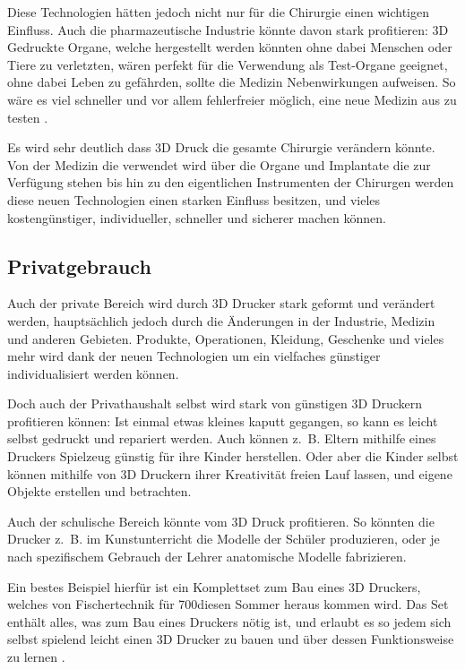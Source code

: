 Diese Technologien hätten jedoch nicht nur für die Chirurgie einen wichtigen Einfluss. Auch die pharmazeutische Industrie könnte davon stark profitieren: 3D Gedruckte Organe, welche hergestellt werden könnten ohne dabei Menschen oder Tiere zu verletzten, wären perfekt für die Verwendung als Test-Organe geeignet, ohne dabei Leben zu gefährden, sollte die Medizin Nebenwirkungen aufweisen. So wäre es viel schneller und vor allem fehlerfreier möglich, eine neue Medizin aus zu testen \parencite{ORGANOVO}. 

Es wird sehr deutlich dass 3D Druck die gesamte Chirurgie verändern könnte. Von der Medizin die verwendet wird über die Organe und Implantate die zur Verfügung stehen bis hin zu den eigentlichen Instrumenten der Chirurgen werden diese neuen Technologien einen starken Einfluss besitzen, und vieles kostengünstiger, individueller, schneller und sicherer machen können.

\newpage
\subsection{Privatgebrauch}

Auch der private Bereich wird durch 3D Drucker stark geformt und verändert werden, hauptsächlich jedoch durch die Änderungen in der Industrie, Medizin und anderen Gebieten. Produkte, Operationen, Kleidung, Geschenke und vieles mehr wird dank der neuen Technologien um ein vielfaches günstiger individualisiert werden können.

Doch auch der Privathaushalt selbst wird stark von günstigen 3D Druckern profitieren können: Ist einmal etwas kleines kaputt gegangen, so kann es leicht selbst gedruckt und repariert werden. Auch können z.~B. Eltern mithilfe eines Druckers Spielzeug günstig für ihre Kinder herstellen. Oder aber die Kinder selbst können mithilfe von 3D Druckern ihrer Kreativität freien Lauf lassen, und eigene Objekte erstellen und betrachten. 

Auch der schulische Bereich könnte vom 3D Druck profitieren. So könnten die Drucker z.~B. im Kunstunterricht die Modelle der Schüler produzieren, oder je nach spezifischem Gebrauch der Lehrer anatomische Modelle fabrizieren.

Ein bestes Beispiel hierfür ist ein Komplettset zum Bau eines 3D Druckers, welches von Fischertechnik für 700\EURO diesen Sommer heraus kommen wird. Das Set enthält alles, was zum Bau eines Druckers nötig ist, und erlaubt es so jedem sich selbst spielend leicht einen 3D Drucker zu bauen und über dessen Funktionsweise zu lernen \parencite{FISCHERTECHNIK}.

